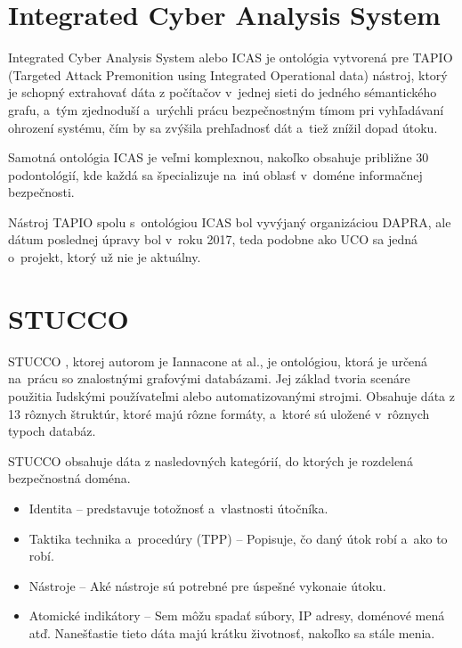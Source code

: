 \documentclass[12pt, a4paper, oneside]{book}
\begin{document}
\section{Integrated Cyber Analysis System}
Integrated Cyber Analysis System\citep{salem2015enabling} alebo ICAS je ontológia vytvorená pre TAPIO (Targeted Attack Premonition using Integrated Operational data) nástroj, ktorý je schopný extrahovať dáta z počítačov v~jednej sieti do jedného sémantického grafu, a~tým zjednoduší a~urýchli prácu bezpečnostným tímom pri vyhľadávaní ohrození systému, čím by sa zvýšila prehľadnosť dát a~tiež znížil dopad útoku. 


Samotná ontológia ICAS je veľmi komplexnou, nakoľko obsahuje približne 30 podontológií, kde každá sa špecializuje na~inú oblasť v~doméne informačnej bezpečnosti.


Nástroj TAPIO spolu s~ontológiou ICAS bol vyvýjaný organizáciou DAPRA, ale dátum poslednej úpravy bol v~roku 2017, teda podobne ako UCO sa jedná o~projekt, ktorý už nie je aktuálny.


\section{STUCCO}
STUCCO \citep{stucco}, ktorej autorom je Iannacone at al., je ontológiou, ktorá je určená na~prácu so znalostnými grafovými databázami. Jej základ tvoria scenáre použitia ľudskými používateľmi alebo automatizovanými strojmi. Obsahuje dáta z 13 rôznych štruktúr, ktoré majú rôzne formáty, a~ktoré sú uložené v~rôznych typoch databáz. 


STUCCO obsahuje dáta z nasledovných kategórií, do ktorých je rozdelená bezpečnostná doména. 
\begin{itemize}
\item Identita -- predstavuje totožnosť a~vlastnosti útočníka.
\item Taktika technika a~procedúry (TPP) -- Popisuje, čo daný útok robí a~ako to robí.
\item Nástroje -- Aké nástroje sú potrebné pre úspešné vykonaie útoku.
\item Atomické indikátory -- Sem môžu spadať súbory, IP adresy, doménové mená atď. Nanešťastie tieto dáta majú krátku životnosť, nakoľko sa stále menia.
\end{itemize}
\end{document}
